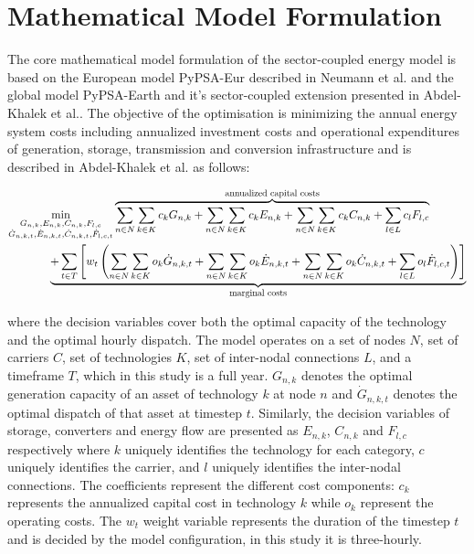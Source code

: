 \section{Mathematical Model Formulation}
\label{subsec:math-formulation}

The core mathematical model formulation of the sector-coupled energy model is based on the European model PyPSA-Eur described in Neumann et al.\cite{Neumann2023} and the global model PyPSA-Earth and it's sector-coupled extension presented in Abdel-Khalek et al.\cite{Abdel-Khalek2024}. The objective of the optimisation is minimizing the annual energy system costs including annualized investment costs and operational expenditures of generation, storage, transmission and conversion infrastructure\cite{Neumann2023} and is described in Abdel-Khalek et al.\cite{Abdel-Khalek2024} as follows:

\begin{equation}
    \begin{aligned}
        \min _{\substack{G_{n, k}, E_{n, k},  C_{n, k}, F_{l, c} \\ \dot{G}_{n, k, t}, \dot{E}_{n, k, t},\dot{C}_{n, k, t}, \dot{F}_{l, c, t}}} &\overbrace{\sum_{n \in N} \sum_{k \in K} c_{k} G_{n, k}+\sum_{n \in N} \sum_{k \in K} c_{k} E_{n, k}+\sum_{n \in N} \sum_{k \in K} c_{k} C_{n, k}+\sum_{l \in L} c_l F_{l,c}}^{\mathclap{\scalebox{0.8}{\text{annualized capital costs}}}}\\
        &\hspace{-2cm}\underbrace{+\sum_{t \in T} \left[w_t\left(\sum_{n \in N} \sum_{k\in K} o_{k} \dot{G}_{n, k, t}+\sum_{n \in N} \sum_{k \in K} o_{k} \dot{E}_{n, k, t}+\sum_{n \in N} \sum_{k \in K} o_{k} \dot{C}_{n, k, t}+\sum_{l \in L} o_{l} \dot{F}_{l, c, t}\right)\right]}_{\mathclap{\scalebox{0.8}{\text{marginal costs}}}}
    \end{aligned}
\end{equation}

where the decision variables cover both the optimal capacity of the technology and the optimal hourly dispatch. The model operates on a set of nodes $N$, set of carriers $C$, set of technologies $K$, set of inter-nodal connections $L$, and a timeframe $T$, which in this study is a full year. $G_{n, k}$ denotes the optimal generation capacity of an asset of technology $k$ at node $n$ and $\dot{G}_{n, k, t}$ denotes the optimal dispatch of that asset at timestep $t$. Similarly, the decision variables of storage, converters and energy flow are presented as $E_{n,k}$, $C_{n,k}$ and $F_{l,c}$ respectively where $k$ uniquely identifies the technology for each category, $c$ uniquely identifies the carrier, and $l$ uniquely identifies the inter-nodal connections. The coefficients represent the different cost components: $c_k$ represents the annualized capital cost in technology $k$ while $o_k$ represent the operating costs. The $w_t$ weight variable represents the duration of the timestep $t$ and is decided by the model configuration, in this study it is three-hourly.

